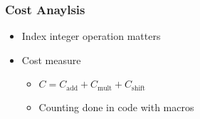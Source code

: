 \begin{frame}
  \frametitle{Cost Anaylsis}
  \begin{itemize}
  \item{Index integer operation matters}
  \setlength\itemsep{1.5em}
  \item{Cost measure
  \begin{itemize}
  \setlength\itemsep{0.5em}
  \item{$C = C_{\text{add}} + C_{\text{mult}} + C_{\text{shift}}$}
  \item{Counting done in code with macros}
  \end{itemize}
  }
  \end{itemize}
\end{frame}